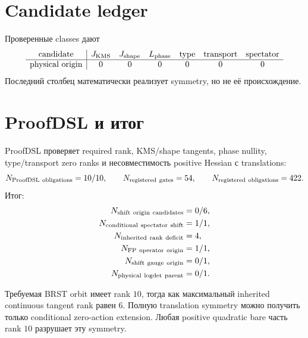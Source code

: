 \section{Candidate ledger}

Проверенные classes дают
\begin{equation}
 \begin{array}{c|cccccc}
 \text{candidate}&J_{\rm KMS}&J_{\rm shape}&L_{\rm phase}
 &\text{type}&\text{transport}&\text{spectator}\\ \hline
 \text{physical origin}&0&0&0&0&0&0
 \end{array}
 \label{eq:v9-kms-brst-shift-candidates}
\end{equation}
Последний столбец математически реализует symmetry, но не её происхождение.

\section{ProofDSL и итог}

ProofDSL проверяет required rank, KMS/shape tangents, phase nullity,
type/transport zero ranks и несовместимость positive Hessian с translations:
\begin{equation}
 N_{\rm ProofDSL\ obligations}=10/10,
 \qquad
 N_{\rm registered\ gates}=54,
 \qquad
 N_{\rm registered\ obligations}=422.
 \label{eq:v9-kms-brst-shift-proofdsl}
\end{equation}
Итог:
\begin{equation}
 \begin{aligned}
 N_{\rm shift\ origin\ candidates}&=0/6,\\
 N_{\rm conditional\ spectator\ shift}&=1/1,\\
 N_{\rm inherited\ rank\ deficit}&=4,\\
 N_{\rm FP\ operator\ origin}&=1/1,\\
 N_{\rm shift\ gauge\ origin}&=0/1,\\
 N_{\rm physical\ logdet\ parent}&=0/1.
 \end{aligned}
 \label{eq:v9-kms-brst-shift-final-ledger}
\end{equation}

\begin{theorem}
Требуемая BRST orbit имеет rank $10$, тогда как максимальный inherited
continuous tangent rank равен $6$. Полную translation symmetry можно
получить только conditional zero-action extension. Любая positive
quadratic bare часть rank $10$ разрушает эту symmetry.
\end{theorem}

